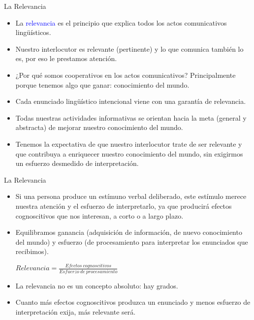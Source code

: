 \documentclass{beamer}
\begin{document}
\begin{frame}{La Relevancia}

	\begin{itemize}
		\item La \textcolor{blue}{relevancia} es el principio que explica todos los actos comunicativos lingüísticos. 
		\item Nuestro interlocutor es relevante (pertinente) y lo que comunica también lo es, por eso le prestamos atención.
		\item ¿Por qué somos cooperativos en los actos comunicativos? Principalmente porque tenemos algo que ganar: conocimiento del mundo.
		\item Cada enunciado lingüístico intencional viene con una garantía de relevancia. 
		\item Todas nuestras actividades informativas se orientan hacia la meta (general y abstracta) de mejorar nuestro conocimiento del mundo.
		\item Tenemos la expectativa de que nuestro interlocutor trate de ser relevante y que contribuya a enriquecer nuestro conocimiento del mundo, sin exigirmos un esfuerzo desmedido de interpretación.
	\end{itemize}

\end{frame}


\begin{frame}{La Relevancia}

	\begin{itemize}
		\item Si una persona produce un estímuno verbal deliberado, este estímulo merece nuestra atención y el esfuerzo de interpretarlo, ya que producirá efectos cognoscitivos que nos interesan, a corto o a largo plazo.
		\item Equilibramos ganancia (adquisición de información, de nuevo conocimiento del mundo) y esfuerzo (de procesamiento para interpretar los enunciados que recibimos).

		\vspace{0.3cm}
		$Relevancia = \frac{Efectos \ cognoscitivos}{Esfuerzo \ de \ procesamiento}$ 
		\vspace{0.3cm}
		\item La relevancia no es un concepto absoluto: hay grados.
		\item Cuanto más efectos cognoscitivos produzca un enunciado y menos esfuerzo de interpretación exija, más relevante será.
	\end{itemize}

\end{frame}
\end{document}
